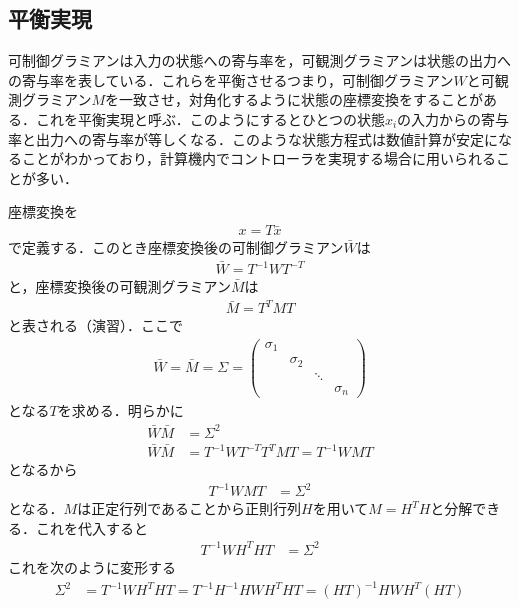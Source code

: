 \subsection{平衡実現}

可制御グラミアンは入力の状態への寄与率を，可観測グラミアンは状態の出力への寄与率を表している．これらを平衡させるつまり，可制御グラミアン$W$と可観測グラミアン$M$を一致させ，対角化するように状態の座標変換をすることがある．これを平衡実現と呼ぶ．このようにするとひとつの状態$x_i$の入力からの寄与率と出力への寄与率が等しくなる．このような状態方程式は数値計算が安定になることがわかっており，計算機内でコントローラを実現する場合に用いられることが多い．


座標変換を
\begin{align}
	x=T\bar{x}
\end{align}で定義する．このとき座標変換後の可制御グラミアン$\bar{W}$は
\begin{align}
	\bar{W}= T^{-1} W T^{-T}
\end{align}
と，座標変換後の可観測グラミアン$\bar{M}$は
\begin{align}
	\bar{M}= T^T M T
\end{align}
と表される（演習）．ここで
\begin{align}
	\bar{W}=\bar{M}= \Sigma 
	= 
	\left(\begin{array}{cccc}
         \sigma_1 &          &       &  \\
                  & \sigma_2 &       &  \\
                  &          & \ddots &  \\
                  &          &       &  \sigma_n
	\end{array}\right)
\end{align}
となる$T$を求める．明らかに
\begin{align}
	\bar{W} \bar{M} &= \Sigma^2
\\
	\bar{W} \bar{M} &= T^{-1} W T^{-T} T^T M T = T^{-1} W M T
\end{align}
となるから
\begin{align}
	T^{-1} W M T &= \Sigma^2
\end{align}
となる．$M$は正定行列であることから正則行列$H$を用いて$M=H^T H$と分解できる．これを代入すると
\begin{align}
	T^{-1} W H^T H T &= \Sigma^2
\end{align}
これを次のように変形する
\begin{align}
	\Sigma^2 &= T^{-1} W H^T H T 
		= T^{-1} H^{-1} H W H^T H T 
		= (HT)^{-1} HWH^T (HT)
\end{align}

